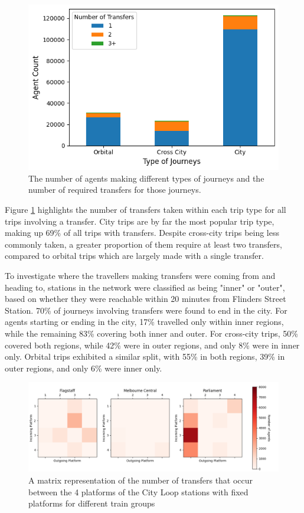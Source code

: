 \begin{figure}[ht]
    \centering
    \includegraphics[width=0.75\linewidth]{images/Case_Study/journeytypetransfers.png}
    \caption{The number of agents making different types of journeys and the number of required transfers for those journeys.}
    \label{fig:transfers_type}
\end{figure}
Figure \ref{fig:transfers_type} highlights the number of transfers taken within each trip type for all trips involving a transfer. City trips are by far the most popular trip type, making up 69\% of all trips with transfers. Despite cross-city trips being less commonly taken, a greater proportion of them require at least two transfers, compared to orbital trips which are largely made with a single transfer. 

To investigate where the travellers making transfers were coming from and heading to, stations in the network were classified as being "inner" or "outer", based on whether they were reachable within 20 minutes from Flinders Street Station. 70\% of journeys involving transfers were found to end in the city. For agents starting or ending in the city, 17\% travelled only within inner regions, while the remaining 83\% covering both inner and outer. For cross-city trips, 50\% covered both regions, while 42\% were in outer regions, and only 8\% were in inner only. Orbital trips exhibited a similar split, with 55\% in both regions, 39\% in outer regions, and only 6\% were inner only. 

\begin{figure}[ht]
    \centering
    \includegraphics[width=1\linewidth]{images/Case_Study/city_loop_platform_transfers_geog.png}
    \caption{A matrix representation of the number of transfers that occur between the 4 platforms of the City Loop stations with fixed platforms for different train groups}
    \label{fig:platform_matrix}
\end{figure}

